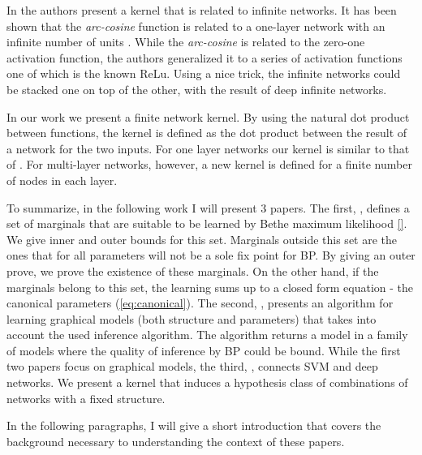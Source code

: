 In \cite{cho2009kernel} the authors present a kernel that is related to infinite networks.
It has been shown that the \textit{arc-cosine} function is related to a one-layer network with an infinite number of units \cite{williams1998computation}.
While the \textit{arc-cosine} is related to the zero-one activation function, the authors generalized it to a series of activation functions one of which is the known ReLu.
Using a nice trick, the infinite networks could be stacked one on top of the other, with the result of deep infinite networks.

In our work \cite{heinemann2016improper} we present a finite network kernel.
By using the natural dot product between functions, the kernel is defined as the dot product between the result of a network for the two inputs.
For one layer networks our kernel is similar to that of \cite{cho2009kernel}.
For multi-layer networks, however, a new kernel is defined for a finite number of nodes in each layer.

To summarize, in the following work I will present $3$ papers.
The first, \cite{heinemann2012cannot}, defines a set of marginals that are suitable to be learned by Bethe maximum likelihood \eqref{}.
We give inner and outer bounds for this set.
Marginals outside this set are the ones that for all parameters will not be a sole fix point for BP.
By giving an outer prove, we prove the existence of these marginals.
On the other hand, if the marginals belong to this set, the learning sums up to a closed form equation - the canonical parameters (\eqref{eq:canonical}).
The second, \cite{heinemann2014inferning}, presents an algorithm for learning graphical models (both structure and parameters) that takes into account the used inference algorithm.
The algorithm returns a model in a family of models where the quality of inference by BP could be bound.
While the first two papers focus on graphical models, the third, \cite{heinemann2016improper}, connects SVM and deep networks.
We present a kernel that induces a hypothesis class of combinations of networks with a fixed structure.

In the following paragraphs, I will give a short introduction that covers the background necessary to understanding the context of these papers.

